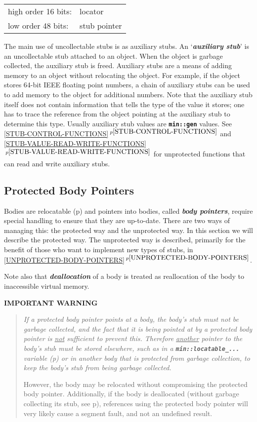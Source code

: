 \documentclass[12pt]{article}
\newcommand{\TT}[1]{{\tt \bfseries #1}}
\newcommand{\key}[1]{{\bf \em #1}\index{#1}}
\newcommand{\skey}[2]{{\bf \em #1#2}\index{#1}}
\newcommand{\ikey}[2]{{\bf \em #1}\index{#2}}
\newcommand{\itemref}[1]{\ref{#1}$\,^{p\pageref{#1}}$}
\newcommand{\pagref}[1]{p\pageref{#1}}
\newcommand{\EOL}{\penalty \exhyphenpenalty}
\begin{document}
\begin{center}
\begin{tabular}{ll}
high order 16 bits:	& locator \\
low order 48 bits:	& stub pointer \\
\end{tabular}
\end{center}

The main use of uncollectable stubs is as auxiliary stubs.
An `\key{auxiliary stub}' is an uncollectable stub attached to an object.
When the object is garbage collected, the auxiliary stub is freed.  Auxiliary
stubs are a means of adding memory to an object without relocating the object.
For example, if the object stores 64-bit IEEE floating point numbers,
a chain of auxiliary stubs can be used to add memory to the object
for additional numbers.  Note that the auxiliary stub itself does not
contain information that tells the type of the value it stores;
one has to trace the reference from the object pointing at the
auxiliary stub to determine this type.  Usually auxiliary stub
values are \TT{min::gen} values.
See \itemref{STUB-CONTROL-FUNCTIONS} and
\itemref{STUB-VALUE-READ-WRITE-FUNCTIONS}
for unprotected functions that can read and write auxiliary stubs.

\subsection{Protected Body Pointers}
\label{PROTECTED-BODY-POINTERS}

Bodies are relocatable
(\pagref{RELOCATABLE-BODY}) and pointers into bodies,
called \skey{body pointer}s,
require special handling to
ensure that they are up-to-date.  There are two ways of managing
this: the protected way and the unprotected way.
In this section we will describe the protected way.
The unprotected way is described, primarily for the benefit of those
who want to implement new types of stubs,
in \itemref{UNPROTECTED-BODY-POINTERS}.

Note also that \ikey{deallocation}{deallocate} of a body is treated as
reallocation of the body to inaccessible virtual memory.

\centerline{\large \bf IMPORTANT WARNING}

\begin{quote} \it
If a protected body pointer points at a body, the body's stub must not
be garbage collected, and the fact that it is being pointed at
by a protected body pointer is \underline{not} sufficient to
prevent this.  Therefore \underline{another}
pointer to the body's stub must
be stored elsewhere, such as in a \TT{min::\EOL locatable\_...}
variable (\pagref{LOCATABLE-VARIABLES}) or in another body that
is protected from garbage collection,
to keep the body's stub from being garbage collected.

However,
the body may be relocated without compromising the protected body
pointer.  Additionally, if the body is deallocated (without
garbage collecting its stub, see \pagref{MIN::DEALLOCATE}),
references using the protected body pointer will very likely
cause a segment fault, and not an undefined result.
\end{quote}
\end{document}
